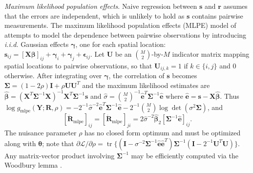 \documentclass[11pt]{article}
\DeclareMathOperator*{\trace}{tr}
\newcommand{\mat}[1]{\mathbf{#1}}
\begin{document}
\emph{Maximum likelihood population effects}.
Naive regression between $\mat s$ and $\mat r$ assumes that the errors are
independent, which is unlikely to hold as $\mat s$ contains pairwise
measurements. The maximum likelihood population effects (MLPE) model of
\cite{clarkeMLPE} attempts to model the dependence between pairwise
observations by introducing \emph{i.i.d.} Gaussian effects
$\bm \gamma$, one for each spatial location:
$\mat s_{ij} = [\mat X \bm \beta]_{ij} + \bm \gamma_i + \bm \gamma_j + \bm
\epsilon_{ij}$.  Let $\mat U$ be an ${M \choose 2}$-by-$M$ indicator matrix
mapping spatial locations to pairwise observations, so that $\mat U_{ij,k} = 1$
if $k \in \{i, j\}$ and $0$ otherwise.  After integrating over $\bm \gamma$, the
correlation of $\mat s$ becomes $\bm \Sigma = (1 - 2\rho) \mat I + \rho \mat U \mat U^T$ and 
the maximum likelihood estimates are 
$\hat{\bm \beta} = (\mat X^T \bm \Sigma^{-1} \mat X)^{-1} \mat X^T \bm \Sigma^{-1} \mat s$ and
$\hat{\sigma} = {M \choose 2}^{-1} \hat{\mat e}^T \bm \Sigma^{-1} \hat{\mat e}$ where 
$\hat{\mat e} = \mat s - \mat X \hat{\bm \beta}$. 
Thus $\log g_{\mathrm{mlpe}}(\mat Y; \mat R, \rho) = -2^{-1} \hat{\sigma}^{-2} \hat{\mat e}^T \bm \Sigma^{-1} \hat{\mat e} - 2^{-1} {M \choose 2} \log \det (\sigma^2 \bm \Sigma)$, and
\[
  [\dot{\mat R}_\mathrm{mlpe}]_{ij} = [\dot{\mat R}_\mathrm{mlpe}]_{ji} = 2 \hat{\sigma}^{-2} \hat{\bm \beta}_2 [\bm \Sigma^{-1} \hat{\mat e}]_{ij}.
\]
The nuisance parameter $\rho$ has no closed form optimum and must be optimized along with $\bm
\theta$; note that $\partial \mathcal{L} / \partial \rho = \trace\{ (\mat I - \sigma^{-2} \bm \Sigma^{-1} \hat{\mat e} \hat{\mat e}^T) \bm \Sigma^{-1} (\mat I - 2^{-1} \mat U^T \mat U) \}$.   
Any matrix-vector product involving $\bm \Sigma^{-1}$ may be efficiently computed via the
Woodbury lemma \cite{woodbury}.
\end{document}
